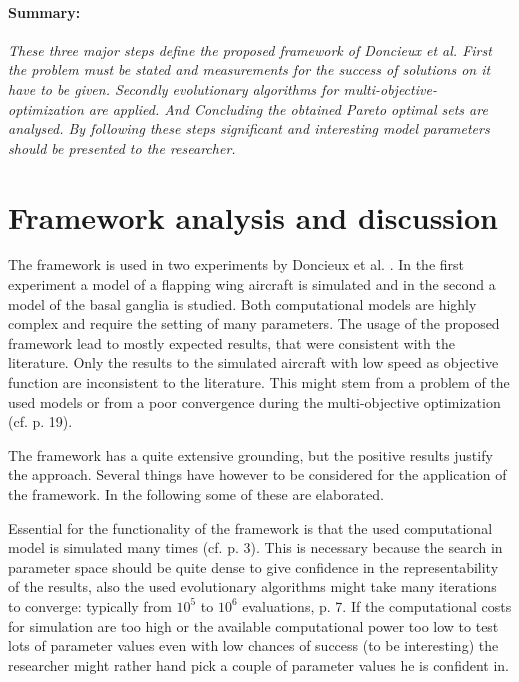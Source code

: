 \documentclass[12pt,twoside]{article}
\theoremstyle{plain}
\theoremstyle{definition}
\theoremstyle{remark}
\begin{document}
\paragraph{Summary:}
\textit{
	These three major steps define the proposed framework of Doncieux et al.
	First the problem must be stated and measurements for the success of solutions on it have to be given. Secondly evolutionary algorithms for multi-objective-optimization are applied. And Concluding the obtained Pareto optimal sets are analysed.
	By following these steps significant and interesting model parameters should be presented to the researcher.
}

\section{Framework analysis and discussion}
\label{sec:analysis}

The framework is used in two experiments by Doncieux et al. \cite{doncieux2015multi}.
In the first experiment a model of a flapping wing aircraft is simulated and in the second a model of the basal ganglia is studied. Both computational models are highly complex and require the setting of many parameters. The usage of the proposed framework lead to mostly expected results, that were consistent with the literature. Only the results to the simulated aircraft with low speed as objective function are inconsistent to the literature. This might stem from a problem of the used models or from a poor convergence during the multi-objective optimization (cf. \cite{doncieux2015multi} p. 19).\medskip

The framework has a quite extensive grounding, but the positive results justify the approach. Several things have however to be considered for the application of the framework. In the following some of these are elaborated.\medskip

Essential for the functionality of the framework is that the used computational model is simulated many times (cf. \cite{doncieux2015multi} p. 3).
This is necessary because the search in parameter space should be quite dense to give confidence in the representability of the results, also the used evolutionary algorithms might take many iterations to converge: \glqq typically from $10^5$ to $10^6$ evaluations\grqq{}, \cite{doncieux2015multi} p. 7.
If the computational costs for simulation are too high or the available computational power too low to test lots of parameter values even with low chances of success (to be interesting) the researcher might rather hand pick a couple of parameter values he is confident in.\medskip
\end{document}
